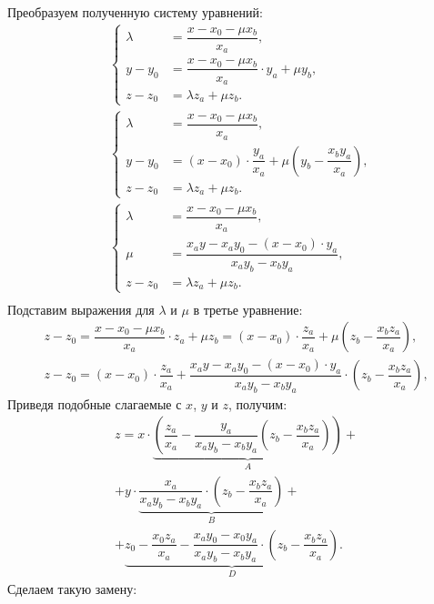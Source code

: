 Преобразуем полученную систему уравнений:
\begin{align*}
& \left\{
\begin{aligned}
	\lambda &= \dfrac{x - x_0 - \mu x_b}{x_a},\\
	y - y_0 &= \dfrac{x - x_0 - \mu x_b}{x_a} \cdot y_a + \mu y_b,\\
	z - z_0 &= \lambda z_a + \mu z_b.
\end{aligned}\right.\\
& \left\{
\begin{aligned}
	\lambda &= \dfrac{x - x_0 - \mu x_b}{x_a},\\
	y - y_0 &= (x - x_0) \cdot \dfrac{y_a}{x_a} + \mu \left(y_b - \dfrac{x_b y_a}{x_a} \right),\\
	z - z_0 &= \lambda z_a + \mu z_b.
\end{aligned}\right.\\
&\left\{
\begin{aligned}
	\lambda &= \dfrac{x - x_0 - \mu x_b}{x_a},\\
	\mu &= \dfrac{x_a y - x_a y_0 - (x - x_0) \cdot y_a}{x_a y_b - x_b y_a},\\
	z - z_0 &= \lambda z_a + \mu z_b.
\end{aligned}\right.\\
\end{align*}
Подставим выражения для $\lambda$ и $\mu$ в третье уравнение:
\begin{gather*}
z - z_0 = \dfrac{x - x_0 - \mu x_b}{x_a} \cdot z_a + \mu z_b = (x - x_0) \cdot \dfrac{z_a}{x_a} + \mu \left( z_b - \dfrac{x_b z_a}{x_a} \right),\\
z - z_0 = (x - x_0) \cdot \dfrac{z_a}{x_a} + \dfrac{x_a y - x_a y_0 - (x - x_0) \cdot y_a}{x_a y_b - x_b y_a} \cdot \left( z_b - \dfrac{x_b z_a}{x_a} \right),
\end{gather*}
Приведя подобные слагаемые с $x$, $y$ и $z$, получим:
\begin{multline*}
z = x \cdot \underbrace{\left( \dfrac{z_a}{x_a} - \dfrac{y_a}{x_a y_b - x_b y_a} \left( z_b - \dfrac{x_b z_a}{x_a} \right) \right)}_A +\\
+ y \cdot \underbrace{\dfrac{x_a}{x_a y_b - x_b y_a} \cdot \left( z_b - \dfrac{x_b z_a}{x_a} \right)}_B +\\
+ \underbrace{z_0 - \dfrac{x_0 z_a}{x_a} - \dfrac{x_a y_0 - x_0 y_a}{x_a y_b - x_b y_a} \cdot \left( z_b - \dfrac{x_b z_a}{x_a} \right)}_D.
\end{multline*}
Сделаем такую замену:
